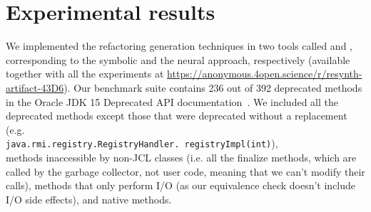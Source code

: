 \documentclass[sigconf,review,anonymous]{acmart}
\begin{document}


\section{Experimental results}\label{sec:experimental-results}

We implemented the refactoring generation techniques in two tools called \tool and \llm, corresponding to the symbolic and the neural approach, respectively (available together with all the experiments at \url{https://anonymous.4open.science/r/resynth-artifact-43D6}).
%
Our benchmark suite contains 236 out of 392 deprecated methods in the Oracle
JDK 15 Deprecated API documentation~\cite{OracleJdk15DeprecatedAPI}.
We included all the deprecated methods except those that were deprecated without a replacement (e.g.\\ \texttt{java.rmi.registry.RegistryHandler.\ registryImpl(int)}), \\
methods inaccessible by non-JCL classes (i.e. all the finalize methods, which are called by the garbage collector, not user code, meaning that we can't modify their calls), 
methods that only perform I/O (as our equivalence check doesn't include I/O side effects),
and native methods.
\end{document}

